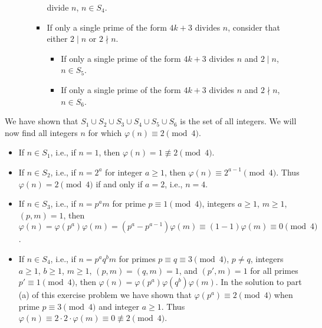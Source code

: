 \begin{solution}
\begin{itemize}
\begin{itemize}
\begin{itemize}
            divide \( n \), \( n \in S_4 \).
          \item
            If only a single prime of the form \( 4k + 3 \) divides \(
            n \), consider that either \( 2 \mid n \) or \( 2 \nmid n
            \).
            \begin{itemize}
              \item
                If only a single prime of the form \( 4k + 3 \)
                divides \( n \) and \( 2 \mid n \), \( n \in S_5 \).
              \item
                If only a single prime of the form \( 4k + 3 \)
                divides \( n \) and \( 2 \nmid n \), \( n \in S_6 \).
            \end{itemize}
          \end{itemize}
      \end{itemize}
  \end{itemize}
  We have shown that \( S_1 \cup S_2 \cup S_3 \cup S_4 \cup S_5 \cup
  S_6 \) is the set of all integers. We will now find all integers \(
  n \) for which \( \varphi(n) \equiv 2 \pmod{4} \).
  \begin{itemize}
  \item
    If \( n \in S_1 \), i.e., if \( n = 1 \), then \( \varphi(n) = 1
    \not\equiv 2 \pmod{4} \).
  \item
    If \( n \in S_2 \), i.e., if \( n = 2^a \) for integer \( a \ge 1
    \), then \( \varphi(n) \equiv 2^{a - 1} \pmod{4} \). Thus \(
    \varphi(n) = 2 \pmod{4} \) if and only if \( a = 2 \), i.e., \( n
    = 4 \).
  \item
    If \( n \in S_3 \), i.e., if \( n = p^a m \) for prime \( p \equiv
    1 \pmod{4} \), integers \( a \ge 1 \), \( m \ge 1 \), \( (p, m) =
    1 \), then \( \varphi(n) = \varphi(p^a) \varphi(m) = (p^a - p^{a -
      1}) \varphi(m) \equiv (1 - 1) \varphi(m) \equiv 0 \pmod{4} \).
  \item
    If \( n \in S_4 \), i.e., if \( n = p^a q^b m \) for primes \( p
    \equiv q \equiv 3 \pmod{4} \), \( p \neq q \), integers \( a \ge 1
    \), \( b \ge 1 \), \( m \ge 1 \), \( (p, m) = (q, m) = 1 \), and
    \( (p', m) = 1 \) for all primes \( p' \equiv 1 \pmod{4} \), then
    \( \varphi(n) = \varphi(p^a) \varphi(q^b) \varphi(m) \). In the
    solution to part (a) of this exercise problem we have shown that
    \( \varphi(p^a) \equiv 2 \pmod{4} \) when prime \( p \equiv 3
    \pmod{4} \) and integer \( a \ge 1 \). Thus \( \varphi(n) \equiv 2
    \cdot 2 \cdot \varphi(m) \equiv 0 \not\equiv 2 \pmod{4} \).

\end{itemize}
\end{solution}
